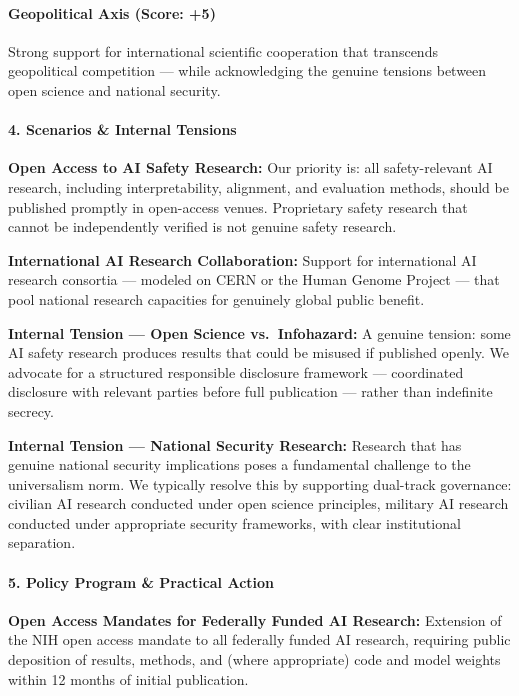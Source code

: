 \paragraph{Geopolitical Axis (Score:
+5)}\label{geopolitical-axis-score-5-2}

Strong support for international scientific cooperation that transcends
geopolitical competition --- while acknowledging the genuine tensions
between open science and national security.

\paragraph{4. Scenarios \& Internal
Tensions}\label{scenarios-internal-tensions-27}

\textbf{Open Access to AI Safety Research:} Our priority is: all
safety-relevant AI research, including interpretability, alignment, and
evaluation methods, should be published promptly in open-access venues.
Proprietary safety research that cannot be independently verified is not
genuine safety research.

\textbf{International AI Research Collaboration:} Support for
international AI research consortia --- modeled on CERN or the Human
Genome Project --- that pool national research capacities for genuinely
global public benefit.

\textbf{Internal Tension --- Open Science vs.~Infohazard:} A genuine
tension: some AI safety research produces results that could be misused
if published openly. We advocate for a structured responsible disclosure
framework --- coordinated disclosure with relevant parties before full
publication --- rather than indefinite secrecy.

\textbf{Internal Tension --- National Security Research:} Research that
has genuine national security implications poses a fundamental challenge
to the universalism norm. We typically resolve this by supporting
dual-track governance: civilian AI research conducted under open science
principles, military AI research conducted under appropriate security
frameworks, with clear institutional separation.

\paragraph{5. Policy Program \& Practical
Action}\label{policy-program-practical-action-27}

\textbf{Open Access Mandates for Federally Funded AI Research:}
Extension of the NIH open access mandate to all federally funded AI
research, requiring public deposition of results, methods, and (where
appropriate) code and model weights within 12 months of initial
publication.

